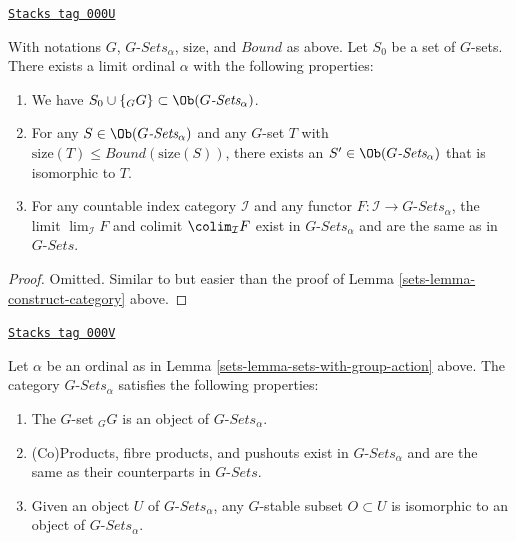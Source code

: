 \begin{lemma}
\label{sets-lemma-sets-with-group-action}
\href{https://stacks.math.columbia.edu/tag/000U}{\texttt{Stacks tag 000U}}

With notations $G$, $G\textit{-Sets}_\alpha$, $\text{size}$,
and $Bound$ as above. Let $S_0$ be a set of $G$-sets.
There exists a limit ordinal $\alpha$ with the following properties:
\begin{enumerate}
\item We have $S_0 \cup \{{}_GG\} \subset \Ob(G\textit{-Sets}_\alpha)$.
\item For any $S \in \Ob(G\textit{-Sets}_\alpha)$ and any
$G$-set $T$ with $\text{size}(T) \leq Bound(\text{size}(S))$,
there exists an $S' \in \Ob(G\textit{-Sets}_\alpha)$
that is isomorphic to $T$.
\item For any countable index category $\mathcal{I}$ and
any functor $F : \mathcal{I} \to G\textit{-Sets}_\alpha$, the
limit $\lim_\mathcal{I} F$ and colimit
$\colim_\mathcal{I} F$ exist in $G\textit{-Sets}_\alpha$
and are the same as in $G\textit{-Sets}$.
\end{enumerate}
\end{lemma}

\begin{proof}

Omitted. Similar to but easier than the proof of
Lemma \ref{sets-lemma-construct-category} above.
\end{proof}

\begin{lemma}
\label{sets-lemma-what-is-in-it-G-sets}
\href{https://stacks.math.columbia.edu/tag/000V}{\texttt{Stacks tag 000V}}

Let $\alpha$ be an ordinal as in Lemma \ref{sets-lemma-sets-with-group-action}
above. The category $G\textit{-Sets}_\alpha$ satisfies the following
properties:
\begin{enumerate}
\item The $G$-set ${}_GG$ is an object of $G\textit{-Sets}_\alpha$.
\item (Co)Products, fibre products, and pushouts
exist in $G\textit{-Sets}_\alpha$
and are the same as their counterparts in $G\textit{-Sets}$.
\item Given an object $U$ of $G\textit{-Sets}_\alpha$,
any $G$-stable subset $O \subset U$  is isomorphic to an object
of $G\textit{-Sets}_\alpha$.
\end{enumerate}
\end{lemma}

